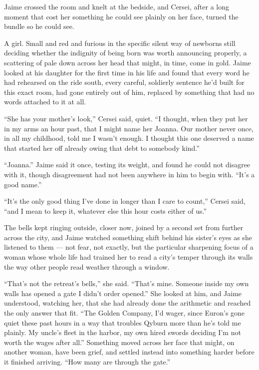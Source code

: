 Jaime crossed the room and knelt at the bedside, and Cersei, after a long moment that cost her something he could see plainly on her face, turned the bundle so he could see.

A girl. Small and red and furious in the specific silent way of newborns still deciding whether the indignity of being born was worth announcing properly, a scattering of pale down across her head that might, in time, come in gold. Jaime looked at his daughter for the first time in his life and found that every word he had rehearsed on the ride south, every careful, soldierly sentence he’d built for this exact room, had gone entirely out of him, replaced by something that had no words attached to it at all.

“She has your mother’s look,” Cersei said, quiet. “I thought, when they put her in my arms an hour past, that I might name her Joanna. Our mother never once, in all my childhood, told me I wasn’t enough. I thought this one deserved a name that started her off already owing that debt to somebody kind.”

“Joanna.” Jaime said it once, testing its weight, and found he could not disagree with it, though disagreement had not been anywhere in him to begin with. “It’s a good name.”

“It’s the only good thing I’ve done in longer than I care to count,” Cersei said, “and I mean to keep it, whatever else this hour costs either of us.”

\sceneBreak

The bells kept ringing outside, closer now, joined by a second set from further across the city, and Jaime watched something shift behind his sister’s eyes as she listened to them — not fear, not exactly, but the particular sharpening focus of a woman whose whole life had trained her to read a city’s temper through its walls the way other people read weather through a window.

“That’s not the retreat’s bells,” she said. “That’s mine. Someone inside my own walls has opened a gate I didn’t order opened.” She looked at him, and Jaime understood, watching her, that she had already done the arithmetic and reached the only answer that fit. “The Golden Company, I’d wager, since Euron’s gone quiet these past hours in a way that troubles Qyburn more than he’s told me plainly. My uncle’s fleet in the harbor, my own hired swords deciding I’m not worth the wages after all.” Something moved across her face that might, on another woman, have been grief, and settled instead into something harder before it finished arriving. “How many are through the gate.”

